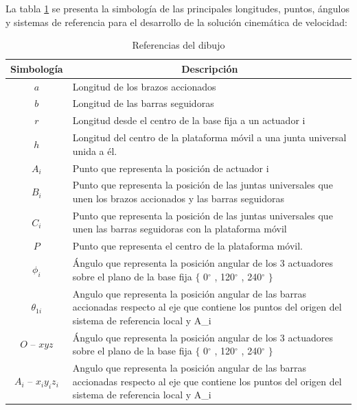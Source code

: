             \newpage


      La tabla \ref{tab:cap4_tabla_6} se presenta la simbología de las principales longitudes, puntos, ángulos y sistemas de referencia   para el desarrollo de la solución cinemática de velocidad:
 
        \begingroup
            \renewcommand{\arraystretch}{2.0}
            \begin{table}[H]
            \centering
            \begin{tabular}{c m{12cm}}
               \hline
               \textbf{Simbología}  & \multicolumn{1}{c}{\textbf{Descripción}}  \\
               \hline           \hline            
             $a$ & Longitud de los brazos accionados \\
            \hline
             $b$ & Longitud de las barras seguidoras \\
            \hline
             $r$ & Longitud desde el centro de la base fija a un actuador i \\
            \hline
             $h$ & Longitud del centro de la plataforma móvil a una junta universal unida a él.\\
            \hline
             $A_{i}$ & Punto que representa la posición de actuador i \\
            \hline
             $ B_{i}$ & Punto que representa la posición de las juntas universales que unen los brazos accionados y las barras seguidoras \\
            \hline
             $C_{i}$ & Punto que representa la posición de las juntas universales que unen las barras seguidoras con la plataforma móvil \\
            \hline
             $P$ & Punto que representa el centro de la plataforma móvil.\\
            \hline
             $\phi _{i}$ & Ángulo que representa la posición angular de los 3 actuadores sobre el plano de la base fija $ \{ $ 0$ ^{\circ} $ , 120$ ^{\circ} $ , 240$ ^{\circ} $ $ \} $ \\
            \hline
             $ \theta _{1i}$ & Angulo que representa la posición angular de las barras accionadas respecto al eje que contiene los puntos del origen del sistema de referencia local y A_{i}  \\
            \hline
             $O$ – $xyz$ & Ángulo que representa la posición angular de los 3 actuadores sobre el plano de la base fija $ \{ $ 0$ ^{\circ} $ , 120$ ^{\circ} $ , 240$ ^{\circ} $ $ \} $ \\
            \hline
             $  A_{i}$ – $x_{i}y_{i}z_{i}$ & Angulo que representa la posición angular de las barras accionadas respecto al eje que contiene los puntos del origen del sistema de referencia local y A_{i}  \\
            \hline
            \end{tabular}
            \caption{Referencias del dibujo}
           \label{tab:cap4_tabla_6}
        \end{table}
        \endgroup        
        
